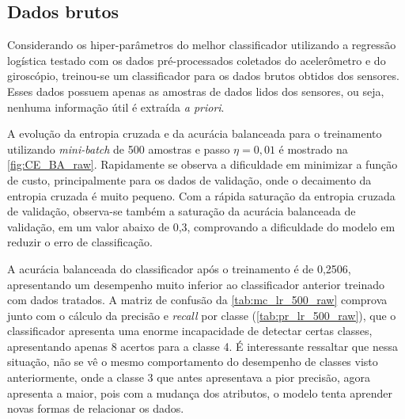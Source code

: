 \subsection{Dados brutos}


Considerando os hiper-parâmetros do melhor classificador utilizando a regressão logística testado com os dados pré-processados coletados do acelerômetro e do giroscópio, treinou-se um classificador para os dados brutos obtidos dos sensores. Esses dados possuem apenas as amostras de dados lidos dos sensores, ou seja, nenhuma informação útil é extraída \textit{a priori}.

A evolução da entropia cruzada e da acurácia balanceada para o treinamento utilizando \textit{mini-batch} de 500 amostras e passo $\eta = 0,01$ é mostrado na \autoref{fig:CE_BA_raw}. Rapidamente se observa a dificuldade em minimizar a função de custo, principalmente para os dados de validação, onde o decaimento da entropia cruzada é muito pequeno. Com a rápida saturação da entropia cruzada de validação, observa-se também a saturação da acurácia balanceada de validação, em um valor abaixo de 0,3, comprovando a dificuldade do modelo em reduzir o erro de classificação.

A acurácia balanceada do classificador após o treinamento é de 0,2506, apresentando um desempenho muito inferior ao classificador anterior treinado com dados tratados. A matriz de confusão da \autoref{tab:mc_lr_500_raw} comprova junto com o cálculo da precisão e \textit{recall} por classe (\autoref{tab:pr_lr_500_raw}), que o classificador apresenta uma enorme incapacidade de detectar certas classes, apresentando apenas 8 acertos para a classe 4. É interessante ressaltar que nessa situação, não se vê o mesmo comportamento do desempenho de classes visto anteriormente, onde a classe 3 que antes apresentava a pior precisão, agora apresenta a maior, pois com a mudança dos atributos, o modelo tenta aprender novas formas de relacionar os dados.


